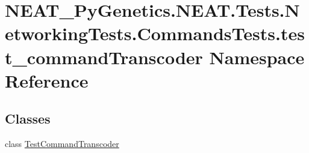 \hypertarget{namespaceNEAT__PyGenetics_1_1NEAT_1_1Tests_1_1NetworkingTests_1_1CommandsTests_1_1test__commandTranscoder}{}\section{N\+E\+A\+T\+\_\+\+Py\+Genetics.\+N\+E\+A\+T.\+Tests.\+Networking\+Tests.\+Commands\+Tests.\+test\+\_\+command\+Transcoder Namespace Reference}
\label{namespaceNEAT__PyGenetics_1_1NEAT_1_1Tests_1_1NetworkingTests_1_1CommandsTests_1_1test__commandTranscoder}
\subsection*{Classes}
\begin{DoxyCompactItemize}
\item 
class \hyperlink{classNEAT__PyGenetics_1_1NEAT_1_1Tests_1_1NetworkingTests_1_1CommandsTests_1_1test__commandTranscoder_1_1TestCommandTranscoder}{Test\+Command\+Transcoder}
\end{DoxyCompactItemize}
